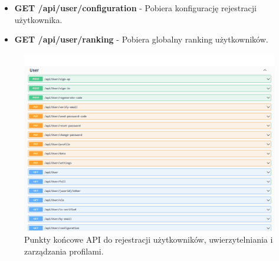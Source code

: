 \documentclass[12pt,a4paper]{article}
\begin{document}
\begin{itemize}
\begin{itemize}
        \item \textbf{GET /api/user/configuration} - Pobiera konfigurację rejestracji użytkownika. 
        \item \textbf{GET /api/user/ranking} - Pobiera globalny ranking użytkowników. 
    \end{itemize}
    \begin{figure}[h!]
        \centering
        \includegraphics[width=1\textwidth]{zdj/user_controller.png}
        \caption{Punkty końcowe API do rejestracji użytkowników, uwierzytelniania i zarządzania profilami.}
    \end{figure}

    \newpage


\end{itemize}
\end{document}
